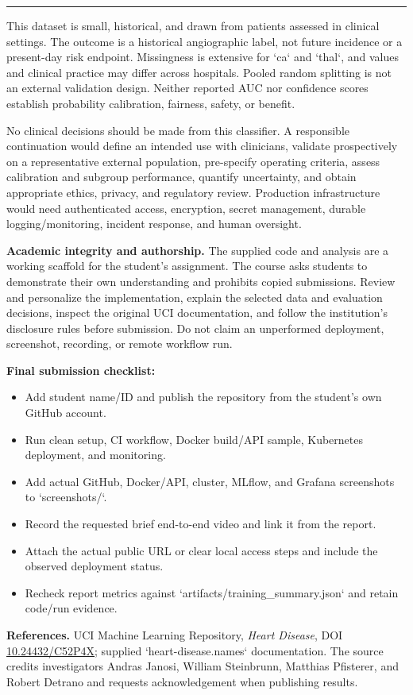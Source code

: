 \documentclass[10pt]{article}
\newcommand{\sectiontitle}[1]{\vspace*{0.15in}{\Large\bfseries\color{navy}#1}\par\vspace{0.08in}\hrule\vspace{0.16in}}
\begin{document}
\newpage
\sectiontitle{9. Limitations, integrity, and submission checklist}
This dataset is small, historical, and drawn from patients assessed in clinical settings. The outcome is a historical angiographic label, not future incidence or a present-day risk endpoint. Missingness is extensive for `ca` and `thal`, and values and clinical practice may differ across hospitals. Pooled random splitting is not an external validation design. Neither reported AUC nor confidence scores establish probability calibration, fairness, safety, or benefit.

No clinical decisions should be made from this classifier. A responsible continuation would define an intended use with clinicians, validate prospectively on a representative external population, pre-specify operating criteria, assess calibration and subgroup performance, quantify uncertainty, and obtain appropriate ethics, privacy, and regulatory review. Production infrastructure would need authenticated access, encryption, secret management, durable logging/monitoring, incident response, and human oversight.

\textbf{Academic integrity and authorship.} The supplied code and analysis are a working scaffold for the student's assignment. The course asks students to demonstrate their own understanding and prohibits copied submissions. Review and personalize the implementation, explain the selected data and evaluation decisions, inspect the original UCI documentation, and follow the institution's disclosure rules before submission. Do not claim an unperformed deployment, screenshot, recording, or remote workflow run.

\textbf{Final submission checklist:}
\begin{itemize}
\item Add student name/ID and publish the repository from the student's own GitHub account.
\item Run clean setup, CI workflow, Docker build/API sample, Kubernetes deployment, and monitoring.
\item Add actual GitHub, Docker/API, cluster, MLflow, and Grafana screenshots to `screenshots/`.
\item Record the requested brief end-to-end video and link it from the report.
\item Attach the actual public URL or clear local access steps and include the observed deployment status.
\item Recheck report metrics against `artifacts/training_summary.json` and retain code/run evidence.
\end{itemize}

\textbf{References.} UCI Machine Learning Repository, \emph{Heart Disease}, DOI \href{https://doi.org/10.24432/C52P4X}{10.24432/C52P4X}; supplied `heart-disease.names` documentation. The source credits investigators Andras Janosi, William Steinbrunn, Matthias Pfisterer, and Robert Detrano and requests acknowledgement when publishing results.
\end{document}
